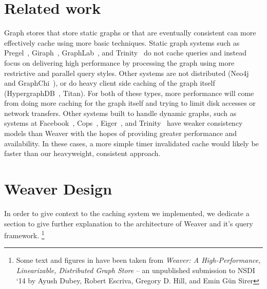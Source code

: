 \documentclass[letterpaper,twocolumn,11pt,tight]{article}
\begin{document}
\section{Related work}\label{sec:related}
Graph stores that store static graphs or that are eventually consistent can more effectively cache using more basic techniques.
Static graph systems such as Pregel~\cite{pregel}, Giraph~\cite{giraph}, GraphLab~\cite{powergraph}, and Trinity~\cite{trinity} do not cache queries and instead focus on delivering high performance by processing the graph using more restrictive and parallel query styles. %
Other systems are not distributed (Neo4j~\cite{neo4j} and GraphChi~\cite{graphchi}), or do heavy client side caching of the graph itself (HypergraphDB~\cite{hypergraphdb}, Titan\cite{titan,titan_slides}).
For both of these types, more performance will come from doing more caching for the graph itself and trying to limit disk accesses or network transfers.
Other systems built to handle dynamic graphs, such as systems at Facebook~\cite{tao,memcache_fb}, Cops~\cite{cops}, Eiger~\cite{eiger}, and Trinity~\cite{trinity} have weaker consistency models than Weaver with the hopes of providing greater performance and availability.
In these cases, a more simple timer invalidated cache would likely be faster than our heavyweight, consistent approach.

\section{Weaver Design}\label{sec:wdesign}
In order to give context to the caching system we implemented, we dedicate a section to give further explanation to the architecture of Weaver and it's query framework.
\footnote{Some text and figures in  have been taken from \emph{Weaver: A High-Performance, Linearizable, Distributed Graph Store} -- an unpublished submission to NSDI `14 by Ayush Dubey, Robert Escriva, Gregory D. Hill, and Emin G\"un Sirer}
\end{document}
